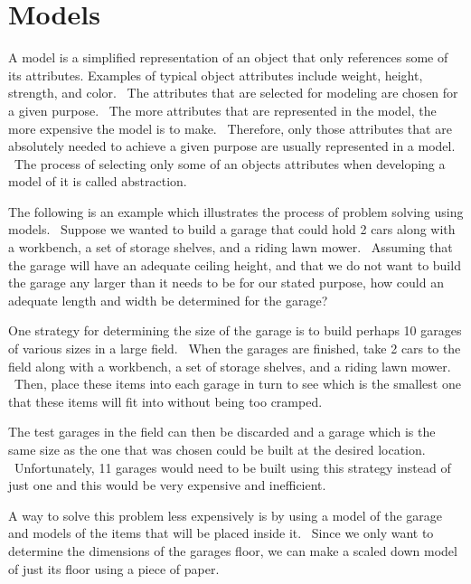 \documentclass[12pt,twoside]{book}
\begin{document}
\section[Models]{Models}
A model is a simplified representation of an object that only references
some of its attributes. Examples of typical object attributes include
weight, height, strength, and color. \ The attributes that are selected
for modeling are chosen for a given purpose. \ The more attributes that
are represented in the model, the more expensive the model is to make.
\ Therefore, only those attributes that are absolutely needed to
achieve a given purpose are usually represented in a model. \ The
process of selecting only some of an object{\textquotesingle}s
attributes when developing a model of it is called abstraction.


\bigskip

The following is an example which illustrates the process of problem
solving using models. \ Suppose we wanted to build a garage that could
hold 2 cars along with a workbench, a set of storage shelves, and a
riding lawn mower. \ Assuming that the garage will have an adequate
ceiling height, and that we do not want to build the garage any larger
than it needs to be for our stated purpose, how could an adequate
length and width be determined for the garage?


\bigskip

One strategy for determining the size of the garage is to build perhaps
10 garages of various sizes in a large field. \ When the garages are
finished, take 2 cars to the field along with a workbench, a set of
storage shelves, and a riding lawn mower. \ Then, place these items
into each garage in turn to see which is the smallest one that these
items will fit into without being too cramped. \ 


\bigskip

The test garages in the field can then be discarded and a garage which
is the same size as the one that was chosen could be built at the
desired location. \ Unfortunately, 11 garages would need to be built
using this strategy instead of just one and this would be very
expensive and inefficient.


\bigskip

A way to solve this problem less expensively is by using a model of the
garage and models of the items that will be placed inside it. \ Since
we only want to determine the dimensions of the
garage{\textquotesingle}s floor, we can make a scaled down model of
just its floor using a piece of paper.
\end{document}
